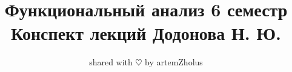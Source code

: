\documentclass{article}
\title{%
	Функциональный анализ 6 семестр \\
	\large Конспект лекций Додонова Н. Ю.}
\author{shared with $\heartsuit$ by artemZholus}
\date{}
\begin{document}
\theoremstyle{definition}
\newtheorem*{definition}{Определение}
\theoremstyle{plain}
\newtheorem{theorem}{Теорема}[section]
\newtheorem{axiom}{Аксиома}
\newtheorem{lemma}[theorem]{Лемма}
\newtheorem{statement}[theorem]{Утверждение}
\newtheorem{nb}[theorem]{N. B.}
\newtheorem{corollary}[theorem]{Следствие}
\theoremstyle{remark}
\newtheorem*{example}{Пример}
\newtheorem{property}[theorem]{Свойство}

\newcommand{\todo}{\textsc{\textbf{TODO}}}
\newcommand{\abs}[1]{\left|#1\right|}
\newcommand{\eqcls}[1]{\left[#1 \right]}
\newcommand{\norm}[1]{\left\|#1\right\|}
\newcommand{\bigslant}[2]{{\raisebox{.2em}{$#1$}\left/\raisebox{-.2em}{$#2$}\right.}}
\newcommand{\normp}[1]{\norm{#1}_p}
\newcommand\restr[2]{{\left.\kern-\nulldelimiterspace #1 \vphantom{\big|} \right|_{#2} }}
\newcommand{\normpp}[2]{\norm{#1}_{#2}}
\newcommand{\intl}[1]{\int\limits_{#1}}
\newcommand{\veel}[1]{\bigvee\limits_{#1}}
\newcommand{\veelr}[2]{\bigvee\limits_{#1}^{#2}}
\newcommand{\defeq}{\mathrel{\stackrel{\makebox[0pt]{\mbox{\normalfont\tiny def}}}{=}}}
\makeatletter
\newcommand*{\rom}[1]{\expandafter\@slowromancap\romannumeral #1@}
\makeatother
\newcommand{\iintl}[1]{\iint\limits_{#1}}
\newcommand{\pdiff}[2]{\frac{\partial #1}{\partial #2}}
\newcommand{\intlr}[2]{\int\limits_{#1}^{#2}}
\newcommand{\suml}[1]{\sum\limits_{#1}}
\newcommand{\sumlr}[2]{\sum\limits_{#1}^{#2}}
\newcommand{\feps}{\forall\varepsilon}
\newcommand{\Epsilon}{\varepsilon}
\newcommand{\scalarp}[2]{\left\langle #1 , #2\right\rangle}
\newcommand{\set}[1]{\left\{#1\right\}}
\renewcommand{\phi}{\varphi}
\maketitle
\tableofcontents
\newpage

\end{document}
